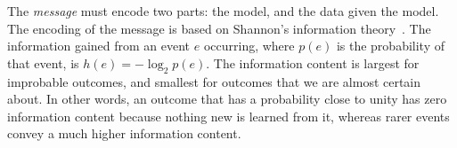 \documentclass{elsarticle}
\begin{document}

The \textit{message} must encode two parts: the model, and the data given the
model. The encoding of the message is based on Shannon's information theory~\cite{shannon}. 
The information gained from an event $e$ occurring, where $p(e)$ is the
probability of that event, is $h(e) = -\log_{2}{p(e)}$. The information content
is largest for improbable outcomes, and smallest for outcomes that we are 
almost certain about. In other words, an outcome that has a probability close
to unity has zero information content because nothing new is learned from it,
whereas rarer events convey a much higher information content.


\end{document}
